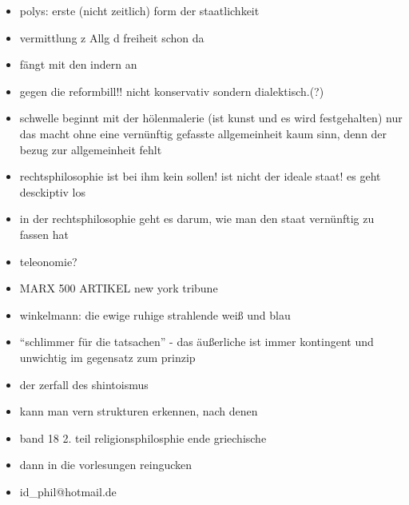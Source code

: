 \documentclass[emulatestandardclasses]{scrartcl}
\begin{document}
\begin{itemize}
  \item polys: erste (nicht zeitlich) form der staatlichkeit
  \item vermittlung z Allg d freiheit schon da
  \item fängt mit den indern an
  \item gegen die reformbill!! nicht konservativ sondern dialektisch.(?)
  \item schwelle beginnt mit der hölenmalerie (ist kunst und es wird festgehalten) nur das macht ohne eine vernünftig gefasste allgemeinheit kaum sinn, denn der bezug zur allgemeinheit fehlt
  \item rechtsphilosophie ist bei ihm kein sollen! ist nicht der ideale staat! es geht desckiptiv los
  \item in der rechtsphilosophie geht es darum, wie man den staat vernünftig zu fassen hat
  \item teleonomie?
  \item MARX 500 ARTIKEL new york tribune
  \item winkelmann: die ewige ruhige strahlende weiß und blau
  \item "`schlimmer für die tatsachen"' - das äußerliche ist immer kontingent und unwichtig im gegensatz zum prinzip
  \item der zerfall des shintoismus
  \item kann man vern strukturen erkennen, nach denen 
  \item band 18 2. teil religionsphilosphie ende griechische
  \item dann in die vorlesungen reingucken
  \item id_phil@hotmail.de
\end{itemize}





%
\end{document}
